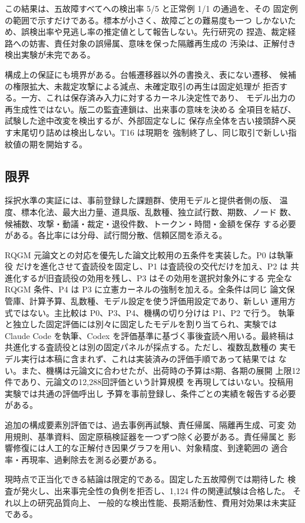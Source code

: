 この結果は、五故障すべてへの検出率 5/5 と正常例 1/1 の通過を、その
固定例の範囲で示すだけである。標本が小さく、故障ごとの難易度も一つ
しかないため、誤検出率や見逃し率の推定値として報告しない。先行研究の
捏造、裁定経路への妨害、責任対象の誤帰属、意味を保った隔離再生成の
汚染は、正解付き検出実験が未完である。

構成上の保証にも境界がある。台帳遷移器以外の書換え、表にない遷移、
候補の権限拡大、未裁定攻撃による減点、未確定取引の再生は固定処理が
拒否する。一方、これは保存済み入力に対するカーネル決定性であり、
モデル出力の再生成性ではない。版二の監査連鎖は、出来事の意味を決める
全項目を結び、試験した途中改変を検出するが、外部固定なしに
保存点全体を古い接頭辞へ戻す末尾切り詰めは検出しない。T16 は現期を
強制終了し、同じ取引で新しい指紋値の期を開始する。

\subsection{限界}\label{sec:eval:limits}

採択水準の実証には、事前登録した課題群、使用モデルと提供者側の版、
温度、標本化法、最大出力量、道具版、乱数種、独立試行数、期数、ノード
数、候補数、攻撃・動議・裁定・退役件数、トークン・時間・金額を保存
する必要がある。各比率には分母、試行間分散、信頼区間を添える。

RQGM 元論文との対応を優先した論文比較用の五条件を実装した。P0 は執筆役
だけを進化させて査読役を固定し、P1 は査読役の交代だけを加え、P2 は
共進化するが旧査読役の効用を残し、P3 はその効用を選択対象外にする
完全な RQGM 条件、P4 は P3 に立憲カーネルの強制を加える。全条件は同じ
論文保管庫、計算予算、乱数種、モデル設定を使う評価用設定であり、新しい
運用方式ではない。主比較は P0、P3、P4、機構の切り分けは P1、P2 で行う。
執筆と独立した固定評価には別々に固定したモデルを割り当てられ、実験では
Claude Code を執筆、Codex を評価基準に基づく事後査読へ用いる。最終稿は
共進化する査読役とは別の固定パネルが採点する。ただし、複数乱数種の
実モデル実行は本稿に含まれず、これは実装済みの評価手順であって結果では
ない。また、機構は元論文に合わせたが、出荷時の予算は8期、各期の展開
上限12件であり、元論文の12,288回評価という計算規模
\cite{iacob2026red}を再現してはいない。投稿用実験では共通の評価呼出し
予算を事前登録し、条件ごとの実績を報告する必要がある。

追加の構成要素別評価では、過去事例再試験、責任帰属、隔離再生成、可変
効用規則、基準資料、固定原稿検証器を一つずつ除く必要がある。責任帰属と
影響修復には人工的な正解付き因果グラフを用い、対象精度、到達範囲の
適合率・再現率、過剰除去を測る必要がある。

現時点で正当化できる結論は限定的である。固定した五故障例では期待した
検査が発火し、出来事完全性の負例を拒否し、1,124 件の関連試験は合格した。
それ以上の研究品質向上、
一般的な検出性能、長期活動性、費用対効果は未実証である。
